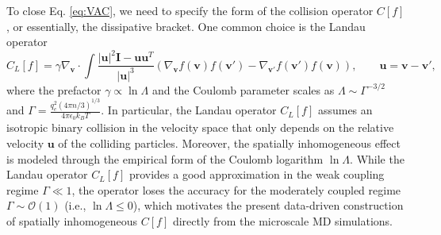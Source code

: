 \documentclass[preprint,1p,times]{elsarticle}
\newcommand{\cO}{\mathcal{O}}
\theoremstyle{definition}
\theoremstyle{remark}
\begin{document}
To close Eq. \eqref{eq:VAC}, we need to specify the form of the collision operator $C[f]$, or essentially, the dissipative bracket. 
One common choice is the Landau operator 
\begin{equation*}
    C_{L}[f] = \gamma \nabla_{\bm{v}} \cdot \int \dfrac{|\bm{u}|^{2} \bm{I} - \bm{u}\bm{u}^{T}}{|\bm{u}|^{3}} \left( \nabla_{\bm{v}} f(\bm{v}) f(\bm{v}') - \nabla_{\bm{v}'} f(\bm{v}') f(\bm{v}) \right), \qquad \bm{u} = \bm{v}-\bm{v}' ,
\end{equation*}
where the prefactor $\gamma \propto \ln\Lambda$ and the Coulomb parameter scales as $\Lambda \sim \Gamma^{-3/2}$ and $\Gamma = \frac{q_{e}^{2} (4\pi n/3)^{1/3}}{4\pi \epsilon_{0} k_{B} T}$.
In particular, the Landau operator $C_L[f]$  assumes an isotropic binary collision in the velocity space that only depends on the relative velocity $\bm u$ of the colliding particles. Moreover, the spatially inhomogeneous effect is modeled through the empirical form of the Coulomb logarithm $\ln \Lambda$.   
%
While the Landau operator $C_L[f]$ provides a good approximation in the weak coupling regime $\Gamma \ll 1$, the operator loses the accuracy for the moderately coupled regime $\Gamma \sim \mathcal{O}(1)$ (i.e., $\ln \Lambda \le 0$), which motivates the present data-driven construction of spatially inhomogeneous $C[f]$ directly from the microscale MD simulations. 




\end{document}
